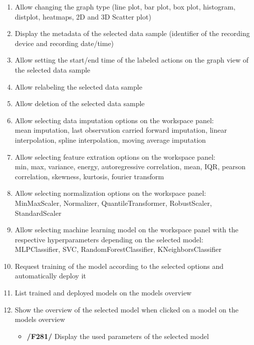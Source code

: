 \begin{enumerate}[{label = \textbf{/F{\protect\twodigits{\arabic{enumi}}}0/}, leftmargin = *}]
    \item \label{itm:change-graph}Allow changing the graph type (line plot, bar plot, box plot, histogram, distplot, heatmaps, 2D and 3D Scatter plot)
    \item \label{itm:metadata}Display the metadata of the selected data sample (identifier of the recording device and recording date/time)
    \item \label{itm:set-timeframe}Allow setting the start/end time of the labeled actions on the graph view of the selected data sample
    \item \label{itm:relabel}Allow relabeling the selected data sample
    \item \label{itm:delete-sample}Allow deletion of the selected data sample
    \item \label{itm:imputation}Allow selecting data imputation options on the workspace panel: \\\gls{mean imputation}, \gls{last observation carried forward imputation}, \gls{linear interpolation}, \gls{spline interpolation}, \gls{moving average imputation}
    \item \label{itm:feature-extraction}Allow selecting feature extration options on the workspace panel: \\min, max, variance, energy, autoregressive correlation, mean, IQR, pearson correlation, skewness, kurtosis, fourier transform
    \item \label{itm:normalization}Allow selecting normalization options on the workspace panel: \\MinMaxScaler, Normalizer, QuantileTransformer, RobustScaler, StandardScaler
    \item \label{itm:model-hyperparameters}Allow selecting machine learning model on the workspace panel with the respective hyperparameters depending on the selected model: \\MLPClassifier, SVC, RandomForestClassifier, KNeighborsClassifier
    \item \label{itm:train}Request training of the model according to the selected options and automatically deploy it
    \item \label{itm:models-over-list}List trained and deployed models on the models overview
    \item \label{itm:models-over-over}Show the overview of the selected model when clicked on a model on the models overview
    \begin{itemize}
        \item \label{itm:models-over-1}\textbf{/F281/} Display the used parameters of the selected model

\end{itemize}
\end{enumerate}
